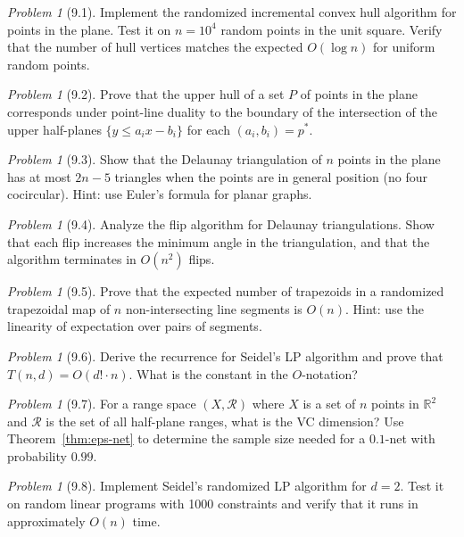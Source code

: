 \documentclass[twoside,12pt]{book}
\theoremstyle{plain}
\theoremstyle{definition}
\theoremstyle{remark}
\newtheorem{problem}[theorem]{Problem}
\begin{document}
\begin{problem}[9.1]
Implement the randomized incremental convex hull algorithm for points in the plane. Test it on $n = 10^4$ random points in the unit square. Verify that the number of hull vertices matches the expected $O(\log n)$ for uniform random points.
\end{problem}

\begin{problem}[9.2]
Prove that the upper hull of a set $P$ of points in the plane corresponds under point-line duality to the boundary of the intersection of the upper half-planes $\{y \leq a_i x - b_i\}$ for each $(a_i, b_i) = p^*$.
\end{problem}

\begin{problem}[9.3]
Show that the Delaunay triangulation of $n$ points in the plane has at most $2n - 5$ triangles when the points are in general position (no four cocircular). Hint: use Euler's formula for planar graphs.
\end{problem}

\begin{problem}[9.4]
Analyze the flip algorithm for Delaunay triangulations. Show that each flip increases the minimum angle in the triangulation, and that the algorithm terminates in $O(n^2)$ flips.
\end{problem}

\begin{problem}[9.5]
Prove that the expected number of trapezoids in a randomized trapezoidal map of $n$ non-intersecting line segments is $O(n)$. Hint: use the linearity of expectation over pairs of segments.
\end{problem}

\begin{problem}[9.6]
Derive the recurrence for Seidel's LP algorithm and prove that $T(n, d) = O(d! \cdot n)$. What is the constant in the $O$-notation?
\end{problem}

\begin{problem}[9.7]
For a range space $(X, \mathcal{R})$ where $X$ is a set of $n$ points in $\mathbb{R}^2$ and $\mathcal{R}$ is the set of all half-plane ranges, what is the VC dimension? Use Theorem~\ref{thm:eps-net} to determine the sample size needed for a $0.1$-net with probability $0.99$.
\end{problem}

\begin{problem}[9.8]
Implement Seidel's randomized LP algorithm for $d = 2$. Test it on random linear programs with 1000 constraints and verify that it runs in approximately $O(n)$ time.
\end{problem}
\end{document}
